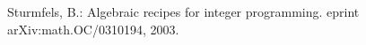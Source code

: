 \documentclass[12pt]{article}
\newenvironment{myverbatim}%
  {\quote\verbatim}%
  {\endverbatim\endquote}
\theoremstyle{definition}
\newcommand{\FourTiTwo}{{\tt 4ti2}}
\begin{document}
\begin{comment}
\subsection{How to Cite \FourTiTwo{}}

Although \FourTiTwo{} is free software for non-commercial use, your
acknowledgment is required. If \FourTiTwo{} is useful in your research
or applications please acknowledge it by referencing it as 
\begin{myverbatim}
@Misc{4ti2,
  author = {4ti2 team},
  title  = {4ti2--A software package for algebraic, geometric
            and combinatorial problems on linear spaces},
  howpublished = {Available at www.4ti2.de}
}
\end{myverbatim}




\subsection{The \FourTiTwo{} Team}
\begin{itemize}
\item Ralf Hemmecke (RISC, University of Linz, Austria)
\item Raymond Hemmecke (University of Magdeburg, Germany)
\item Matthias K\"oppe (University of Magdeburg, Germany)
\item Peter Malkin (CORE, Universit\'e catholique de Louvain, Belgium)
\item Matthias Walter (University of Magdeburg, Germany)
\end{itemize}



\subsection{Acknowledgments}

We are truly grateful to several people for many suggestions and
interesting conversations that led to an improvement of our
software. In the dearest hope that we do not forget someone in the
following collection of names, our thanks goes to (in alphabetical
order): Maya Ahmed, Jes\'us De Loera, Serkan Hosten, Diana Maclagan,
Kristen Nairn, R\"udiger Schultz, Bernd Sturmfels, Seth Sullivant,
Rekha Thomas, Ruriko Yoshida. 


\end{comment}



\begin{thebibliography}{99}
Sturmfels, B.: Algebraic recipes for integer programming. 
eprint arXiv:math.OC/0310194, 2003.
\end{thebibliography}	
\end{document}
